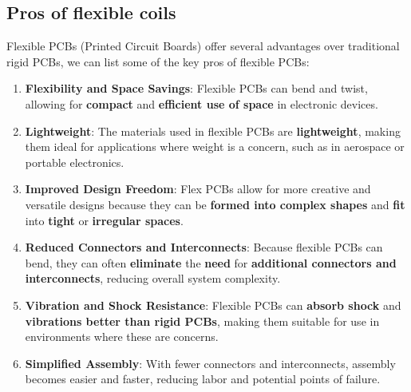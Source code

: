 \subsection{Pros of flexible coils}
Flexible PCBs (Printed Circuit Boards) offer several advantages over traditional rigid PCBs, we can list some of the key pros of flexible PCBs:

\begin{enumerate}
    \item \textbf{Flexibility and Space Savings}: Flexible PCBs can bend and twist, allowing for \textbf{compact} and \textbf{efficient use of space} in electronic devices.
    
    \item \textbf{Lightweight}: The materials used in flexible PCBs are \textbf{lightweight}, making them ideal for applications where weight is a concern, such as in aerospace or portable electronics.
    
    \item \textbf{Improved Design Freedom}: Flex PCBs allow for more creative and versatile designs because they can be \textbf{formed into complex shapes} and \textbf{fit} into \textbf{tight} or \textbf{irregular spaces}.
    
    \item \textbf{Reduced Connectors and Interconnects}: Because flexible PCBs can bend, they can often \textbf{eliminate} the \textbf{need} for \textbf{additional connectors and interconnects}, reducing overall system complexity.
    
    \item \textbf{Vibration and Shock Resistance}: Flexible PCBs can \textbf{absorb shock} and \textbf{vibrations better than rigid PCBs}, making them suitable for use in environments where these are concerns.

    \item \textbf{Simplified Assembly}: With fewer connectors and interconnects, assembly becomes easier and faster, reducing labor and potential points of failure.
\end{enumerate}